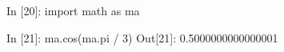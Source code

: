 \documentclass{magnoliaold}
\begin{document}
\begin{pythoncode}
In [20]: import math as ma

In [21]: ma.cos(ma.pi / 3)
Out[21]: 0.5000000000000001
\end{pythoncode}









\end{document}
